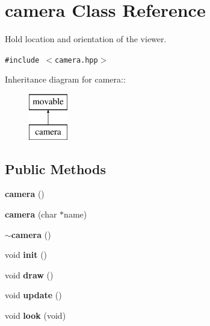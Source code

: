 \section{camera  Class Reference}
\label{classcamera}
Hold location and orientation of the viewer. 


{\tt \#include $<$camera.hpp$>$}

Inheritance diagram for camera::\begin{figure}[H]
\begin{center}
\leavevmode
\includegraphics[height=2cm]{classcamera}
\end{center}
\end{figure}
\subsection*{Public Methods}
\begin{CompactItemize}
\item 
{}
{\bf camera} ()\label{classcamera_a0}

\item 
{}
{\bf camera} (char $\ast$name)\label{classcamera_a1}

\item 
{}
{\bf $\sim$camera} ()\label{classcamera_a2}

\item 
{}
void {\bf init} ()\label{classcamera_a3}

\item 
{}
void {\bf draw} ()\label{classcamera_a4}

\item 
{}
void {\bf update} ()\label{classcamera_a5}

\item 
{}
void {\bf look} (void)\label{classcamera_a6}

\end{CompactItemize}
